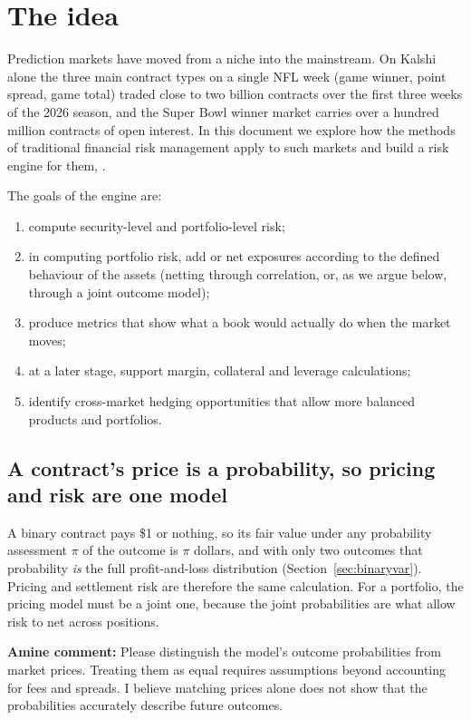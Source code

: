 \section{The idea}\label{sec:idea}


Prediction markets have moved from a niche into the mainstream. On Kalshi alone the three main contract types on a single NFL week (game winner, point spread, game total) traded close to two billion contracts over the first three weeks of the 2026 season, and the Super Bowl winner market carries over a hundred million contracts of open interest. In this document we explore how the methods of traditional financial risk management apply to such markets and build a risk engine for them, \aname.

The goals of the engine are:
\begin{enumerate}[nosep]
\item compute security-level and portfolio-level risk;
\item in computing portfolio risk, add or net exposures according to the defined behaviour of the assets (netting through correlation, or, as we argue below, through a joint outcome model);
\item produce metrics that show what a book would actually do when the market moves;
\item at a later stage, support margin, collateral and leverage calculations;
\item identify cross-market hedging opportunities that allow more balanced products and portfolios.
\end{enumerate}

\subsection{A contract's price is a probability, so pricing and risk are one model}\label{sec:pricing}


A binary contract pays \$1 or nothing, so its fair value under any probability assessment $\pi$ of the outcome is $\pi$ dollars, and with only two outcomes that probability \emph{is} the full profit-and-loss distribution (Section~\ref{sec:binaryvar}). Pricing and settlement risk are therefore the same calculation. For a portfolio, the pricing model must be a joint one, because the joint probabilities are what allow risk to net across positions.

{\color{red}\textbf{Amine comment:} Please distinguish the model's outcome probabilities from market prices. Treating them as equal requires assumptions beyond accounting for fees and spreads. I believe matching prices alone does not show that the probabilities accurately describe future outcomes.}

